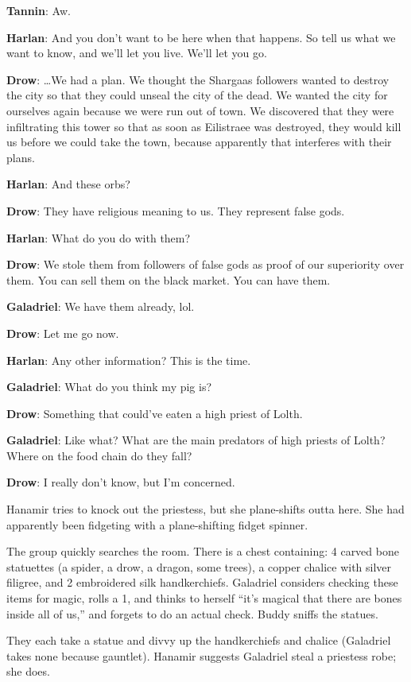 \documentclass[smalldemyvopaper,11pt,twoside,onecolumn,openright,extrafontsizes]{memoir}
\begin{document}
\textbf{Tannin}: Aw.

\textbf{Harlan}: And you don't want to be here when that happens. So
tell us what we want to know, and we'll let you live. We'll let you go.

\textbf{Drow}: \ldots We had a plan. We thought the Shargaas followers
wanted to destroy the city so that they could unseal the city of the
dead. We wanted the city for ourselves again because we were run out of
town. We discovered that they were infiltrating this tower so that as
soon as Eilistraee was destroyed, they would kill us before we could
take the town, because apparently that interferes with their plans.

\textbf{Harlan}: And these orbs?

\textbf{Drow}: They have religious meaning to us. They represent false
gods.

\textbf{Harlan}: What do you do with them?

\textbf{Drow}: We stole them from followers of false gods as proof of
our superiority over them. You can sell them on the black market. You
can have them.

\textbf{Galadriel}: We have them already, lol.

\textbf{Drow}: Let me go now.

\textbf{Harlan}: Any other information? This is the time.

\textbf{Galadriel}: What do you think my pig is?

\textbf{Drow}: Something that could've eaten a high priest of Lolth.

\textbf{Galadriel}: Like what? What are the main predators of high
priests of Lolth? Where on the food chain do they fall?

\textbf{Drow}: I really don't know, but I'm concerned.

Hanamir tries to knock out the priestess, but she plane-shifts outta
here. She had apparently been fidgeting with a plane-shifting fidget
spinner.

The group quickly searches the room. There is a chest containing: 4
carved bone statuettes (a spider, a drow, a dragon, some trees), a
copper chalice with silver filigree, and 2 embroidered silk
handkerchiefs. Galadriel considers checking these items for magic, rolls
a 1, and thinks to herself ``it's magical that there are bones inside
all of us,'' and forgets to do an actual check. Buddy sniffs the
statues.

They each take a statue and divvy up the handkerchiefs and chalice
(Galadriel takes none because gauntlet). Hanamir suggests Galadriel
steal a priestess robe; she does.
\end{document}
